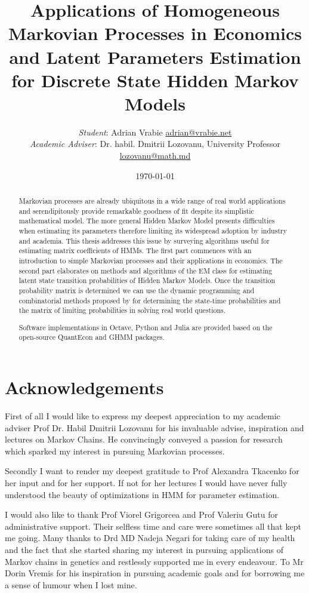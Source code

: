 \documentclass[a4paper,12pt]{article}
\title{\textbf{Applications of Homogeneous Markovian Processes in Economics and Latent Parameters Estimation for Discrete State Hidden Markov Models}}
\author{\textit{Student}: Adrian Vrabie \href{adrian@vrabie.net}{adrian@vrabie.net}\\
		\textit{Academic Adviser}: Dr. habil. Dmitrii Lozovanu, University Professor \\
\href{lozovanu@math.md}{lozovanu@math.md}}
\date{\today}
\theoremstyle{definition}
\begin{document}
\maketitle
\begin{abstract}
Markovian processes are already ubiquitous in a wide range of real world applications and serendipitously provide remarkable goodness of fit despite its simplistic mathematical model.  The more general Hidden Markov Model presents difficulties when estimating its parameters therefore limiting its widespread adoption by industry and academia. This thesis addresses this issue by surveying algorithms useful for estimating matrix coefficients of HMMs. 
The first part commences with an introduction to simple Markovian processes and their applications in economics. The second part elaborates on methods and algorithms of the EM class for estimating latent state transition probabilities of Hidden Markov Models. 
Once the transition probability matrix is determined we can use the dynamic programming and combinatorial methods proposed by \cite{Lozovanu15} for determining the state-time probabilities and the matrix of limiting probabilities in solving real world questions.

Software implementations in Octave, Python and Julia are provided based on the open-source QuantEcon  and GHMM packages.

\end{abstract}
\newpage
\tableofcontents
\newpage
\listoffigures



\newpage
\setcounter{secnumdepth}{0}
\section{Acknowledgements}
\setcounter{secnumdepth}{1}
First of all I would like to express my deepest appreciation to my academic adviser Prof Dr. Habil Dmitrii Lozovanu for his invaluable advise, inspiration and lectures on Markov Chains. He convincingly conveyed a passion for research which sparked my interest in pursuing Markovian processes.

Secondly I want to render my deepest gratitude to Prof Alexandra Tkacenko for her input and for her support. If not for her lectures I would have never fully understood the beauty of optimizations in HMM for parameter estimation. 

I would also like to thank Prof Viorel Grigorcea and Prof Valeriu Gutu for administrative support. Their selfless time and care were sometimes all that kept me going.
Many thanks to Drd MD Nadeja Negari for taking care of my health and the fact that she started sharing my interest in pursuing applications of Markov chains in genetics and restlessly supported me in every endeavour.  To Mr Dorin Vremis for his inspiration in pursuing academic goals and for borrowing me a sense of humour when I lost mine. 
\end{document}
